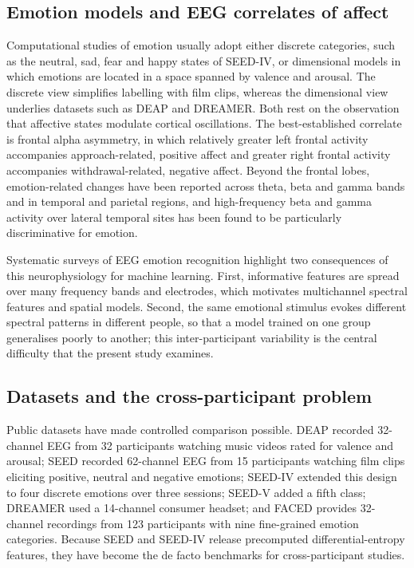 \subsection{Emotion models and EEG correlates of affect}
Computational studies of emotion usually adopt either discrete categories, such as the neutral, sad, fear and happy states of SEED-IV, or dimensional models in which emotions are located in a space spanned by valence and arousal\cite{russell}. The discrete view simplifies labelling with film clips, whereas the dimensional view underlies datasets such as DEAP\cite{deap} and DREAMER\cite{dreamer}. Both rest on the observation that affective states modulate cortical oscillations. The best-established correlate is frontal alpha asymmetry, in which relatively greater left frontal activity accompanies approach-related, positive affect and greater right frontal activity accompanies withdrawal-related, negative affect\cite{davidson,coan}. Beyond the frontal lobes, emotion-related changes have been reported across theta, beta and gamma bands and in temporal and parietal regions, and high-frequency beta and gamma activity over lateral temporal sites has been found to be particularly discriminative for emotion\cite{seed}.

Systematic surveys of EEG emotion recognition\cite{alarcao,jenke} highlight two consequences of this neurophysiology for machine learning. First, informative features are spread over many frequency bands and electrodes, which motivates multichannel spectral features and spatial models. Second, the same emotional stimulus evokes different spectral patterns in different people, so that a model trained on one group generalises poorly to another; this inter-participant variability is the central difficulty that the present study examines.


\subsection{Datasets and the cross-participant problem}
Public datasets have made controlled comparison possible. DEAP recorded 32-channel EEG from 32 participants watching music videos rated for valence and arousal\cite{deap}; SEED recorded 62-channel EEG from 15 participants watching film clips eliciting positive, neutral and negative emotions\cite{seed}; SEED-IV extended this design to four discrete emotions over three sessions\cite{seediv}; SEED-V added a fifth class\cite{seedv}; DREAMER used a 14-channel consumer headset\cite{dreamer}; and FACED provides 32-channel recordings from 123 participants with nine fine-grained emotion categories\cite{faced}. Because SEED and SEED-IV release precomputed differential-entropy features, they have become the de facto benchmarks for cross-participant studies.


